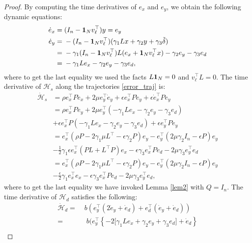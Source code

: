 \documentclass[journal,twoside]{IEEEtran}
\begin{document}
 \begin{proof}
 By computing the time derivatives of $e_x$ and $e_y$, we obtain the following dynamic equations:
\begin{align}
 \dot e_x=& \; (I_n-{\bf 1}_N v_\ell^\top)y= e_y \nonumber \\
 \dot e_y=&\; - (I_n-{\bf 1}_N v_\ell^\top) (\gamma_1 L x +\gamma_2 y+ \gamma_3 \tilde \delta)\nonumber \\
 =& \;-\gamma_1 (I_n-{\bf 1}_N v_\ell^\top)L(e_x+{\bf 1}_Nv_\ell^\top x) -\gamma_2 e_y-\gamma_3 e_d \nonumber \\
 =&\; -\gamma_1 L e_x -\gamma_2e_y -\gamma_3 e_d, 
 \label{error_traj}
\end{align}
 where to get the last equality we used the facts   $L {\bf 1}_N=0$ and  $v^\top_\ell L=0$. 
 The time derivative of  ${\mathcal H}_s$ along the trajectories \eqref{error_traj} is: 
 \begin{align}
 \dot{\mathcal H}_s&=  \rho e_x^\top P \dot e_x +2 \mu e_y^\top \dot e_y +\epsilon e_x^\top P \dot e_y +\epsilon \dot e_x^\top P e_y \nonumber \\
 &= \rho e_x^\top P e_y +2 \mu e_y^\top \left(-\gamma_1 L e_x -\gamma_2e_y -\gamma_3 e_d  \right) \nonumber \\
 &+ \epsilon e_x^\top P\left( -\gamma_1 L e_x -\gamma_2e_y -\gamma_3 e_d \right)+ \epsilon e_y^\top P e_y \nonumber \\
 &= e_x^\top \left( \rho P -2\gamma_1 \mu L^\top -\epsilon \gamma_2 P   \right) e_y -e_y^\top \left( 2 \mu  \gamma_2 I_n - \epsilon P \right)e_y\nonumber \\
 & -\tfrac{1}{2}\gamma_1\epsilon e_x^\top (PL+L^\top P) e_x -\epsilon \gamma_3 e_x^\top P e_d -2\mu \gamma_3e_y^\top e_d \nonumber \\
 &= e_x^\top \left( \rho P -2\gamma_1 \mu L^\top -\epsilon \gamma_2 P   \right) e_y -e_y^\top \left( 2 \mu  \gamma_2 I_n - \epsilon P \right)e_y \nonumber \\
 &- \tfrac{\epsilon}{2}\gamma_1e_x^\top e_x -\epsilon \gamma_3 e_x^\top P e_d -2\mu \gamma_3e_y^\top e_d,
 \label{dotHs}
  \end{align}
  where to get the last equality we have invoked Lemma \ref{lem2} with $Q=I_n$.  
  The time derivative of $\mathcal H_d$ satisfies the following:
\begin{align}
\dot {\mathcal H}_d =& \;b\left(e_y^\top (2 \dot e_y +\dot e_d)+ e_d^\top (\dot e_y +\dot e_d)\right) \nonumber \\
 =&\;  \;b\Big(e_y^\top \left\{-2 \Big [ \gamma_1 L e_x +\gamma_2e_y +\gamma_3 e_d\Big]+\dot e_d\right\} \nonumber \\

\end{align}
\end{proof}
\end{document}
